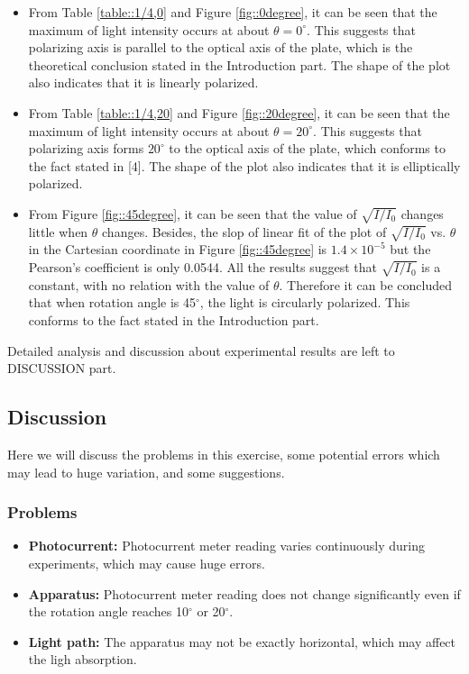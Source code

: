 \documentclass[a4paper]{article}
\begin{document}
\begin{itemize}
	\item From Table \ref{table::1/4,0} and Figure \ref{fig::0degree}, it can be seen that the maximum of light intensity occurs at about $\theta = 0^\circ$. This suggests that polarizing axis is parallel to the optical axis of the plate, which is the theoretical conclusion stated in the Introduction part. The shape of the plot also indicates that it is linearly polarized.
	\item From Table \ref{table::1/4,20} and Figure \ref{fig::20degree}, it can be seen that the maximum of light intensity occurs at about $\theta = 20^\circ$. This suggests that polarizing axis forms $20^\circ$ to the optical axis of the plate, which conforms to the fact stated in [4]. The shape of the plot also indicates that it is elliptically polarized.
	\item From Figure \ref{fig::45degree}, it can be seen that the value of $\sqrt{I/I_0}$ changes little when $\theta$ changes. Besides, the slop of linear fit of the plot of $\sqrt{I/I_0}$ vs. $\theta$ in the Cartesian coordinate in Figure \ref{fig::45degree} is $1.4 \times 10^{-5}$ but the Pearson's coefficient is only 0.0544. All the results suggest that $\sqrt{I/I_0}$ is a constant, with no relation with the value of $\theta$. Therefore it can be concluded that when rotation angle is 45$^\circ$, the light is circularly polarized. This conforms to the fact stated in the Introduction part.

\end{itemize}

Detailed analysis and discussion about experimental results are left to DISCUSSION part.

\subsection{Discussion}

Here we will discuss the problems in this exercise, some potential errors which may lead to huge variation, and some suggestions.

\subsubsection{Problems}

\begin{itemize}
	\item \textbf{Photocurrent:} Photocurrent meter reading varies continuously during experiments, which may cause huge errors.
	\item \textbf{Apparatus:} Photocurrent meter reading does not change significantly even if the rotation angle reaches 10$^\circ$ or 20$^\circ$.
	\item \textbf{Light path:} The apparatus may not be exactly horizontal, which may affect the ligh absorption.
\end{itemize}
\end{document}
